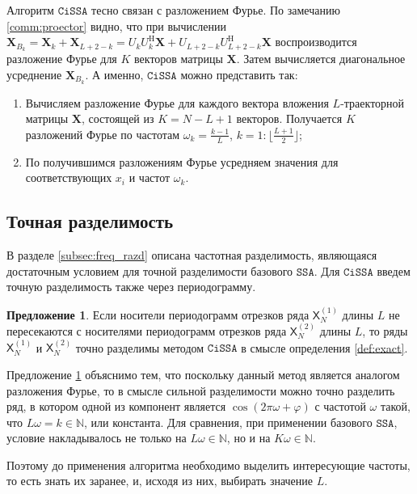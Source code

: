 \documentclass[12pt, specialist, subf
]{disser}
\theoremstyle{definition}
\newcommand{\SSA}{\texttt{SSA}}
\newcommand{\CISSA}{\texttt{CiSSA}}
\newcommand{\TS}{\mathsf{X}}
\newtheorem{proposition}{Предложение}
\begin{document}
Алгоритм $\CISSA$ тесно связан с разложением Фурье. По замечанию \ref{comm:proector} видно, что при вычислении $\mathbf X_{B_k} = \mathbf X_k + \mathbf X_{L+2-k} = U_k U_k^\mathrm{H} \mathbf X + U_{L+2-k} U_{L+2-k}^\mathrm{H} \mathbf X$  воспроизводится разложение Фурье для $K$ векторов матрицы $\mathbf{X}$. Затем вычисляется диагональное усреднение $\mathbf X_{B_k}$. А именно, $\CISSA$ можно представить так:
\begin{enumerate}
	\item Вычисляем разложение Фурье для каждого вектора вложения $L$-траекторной матрицы $\mathbf{X}$, состоящей из $K = N - L + 1$ векторов. Получается $K$ разложений Фурье по частотам $\omega_k = \frac{k-1}{L}$, $k = 1:\lfloor \frac{L+1}{2} \rfloor$;
	\item По получившимся разложениям Фурье усредняем значения для соответствующих $x_i$ и частот $\omega_k$.
\end{enumerate}

\subsection{Точная разделимость}

В разделе \ref{subsec:freq_razd} описана частотная разделимость, являющаяся достаточным условием для точной разделимости базового $\SSA$. Для $\CISSA$ введем точную разделимость также через периодограмму.

\begin{proposition}
	\label{def:exact_cissa}
	Если носители периодограмм отрезков ряда \( \TS_N^{(1)} \) длины \( L \) не пересекаются с носителями периодограмм отрезков ряда \( \TS_N^{(2)} \) длины \( L \), то ряды \( \TS_N^{(1)} \) и \( \TS_N^{(2)} \) точно разделимы методом $\CISSA$ в смысле определения \ref{def:exact}.
\end{proposition}


Предложение \ref{def:exact_cissa} объяснимо тем, что поскольку данный метод является аналогом разложения Фурье, то в смысле сильной разделимости можно точно разделить ряд, в котором одной из компонент является $\cos(2\pi \omega + \varphi)$ с частотой $\omega$ такой, что $L\omega = k \in \mathbb N$, или константа. Для сравнения, при применении базового $\SSA$, условие накладывалось не только на $L\omega \in \mathbb N$, но и на $K\omega \in \mathbb N$.

Поэтому до применения алгоритма необходимо выделить интересующие частоты, то есть знать их заранее, и, исходя из них, выбирать значение $L$.
\end{document}

